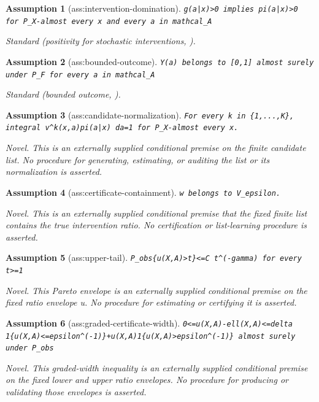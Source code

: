 \documentclass{article}
\newtheorem{assumption}{Assumption}
\begin{document}
\begin{assumption}[ass:intervention-domination]\label{ass:intervention-domination}
\texttt{g(a|x)>0 implies pi(a|x)>0 for P\_X-almost every x and every a in mathcal\_A}
\par\smallskip\noindent\emph{Standard} (positivity for stochastic interventions, \cite{schroder2025conformal}).
\end{assumption}

\begin{assumption}[ass:bounded-outcome]\label{ass:bounded-outcome}
\texttt{Y(a) belongs to [0,1] almost surely under P\_F for every a in mathcal\_A}
\par\smallskip\noindent\emph{Standard} (bounded outcome, \cite{cauchois2020robustvalidation}).
\end{assumption}

\begin{assumption}[ass:candidate-normalization]\label{ass:candidate-normalization}
\texttt{For every k in \{1,...,K\}, integral v\textasciicircum{}k(x,a)pi(a|x) da=1 for P\_X-almost every x.}
\par\smallskip\noindent\emph{Novel.} This is an externally supplied conditional premise on the finite candidate list. No procedure for generating, estimating, or auditing the list or its normalization is asserted.
\end{assumption}

\begin{assumption}[ass:certificate-containment]\label{ass:certificate-containment}
\texttt{w belongs to V\_epsilon.}
\par\smallskip\noindent\emph{Novel.} This is an externally supplied conditional premise that the fixed finite list contains the true intervention ratio. No certification or list-learning procedure is asserted.
\end{assumption}

\begin{assumption}[ass:upper-tail]\label{ass:upper-tail}
\texttt{P\_obs\{u(X,A)>t\}<=C t\textasciicircum{}(-gamma) for every t>=1}
\par\smallskip\noindent\emph{Novel.} This Pareto envelope is an externally supplied conditional premise on the fixed ratio envelope u. No procedure for estimating or certifying it is asserted.
\end{assumption}

\begin{assumption}[ass:graded-certificate-width]\label{ass:graded-certificate-width}
\texttt{0<=u(X,A)-ell(X,A)<=delta 1\{u(X,A)<=epsilon\textasciicircum{}(-1)\}+u(X,A)1\{u(X,A)>epsilon\textasciicircum{}(-1)\} almost surely under P\_obs}
\par\smallskip\noindent\emph{Novel.} This graded-width inequality is an externally supplied conditional premise on the fixed lower and upper ratio envelopes. No procedure for producing or validating those envelopes is asserted.
\end{assumption}
\end{document}
